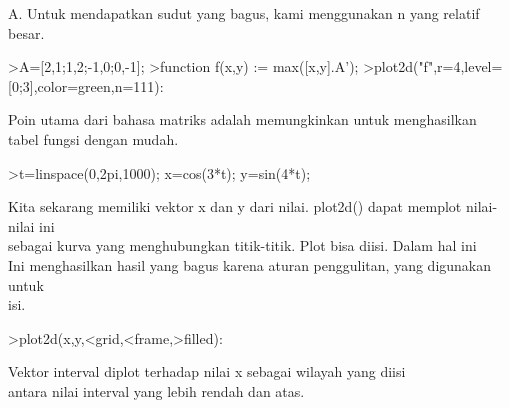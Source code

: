 \documentclass[a4paper,10pt]{article}
\begin{document}
\begin{eulernotebook}
\begin{eulercomment}
\begin{eulercomment}
\begin{eulercomment}
\begin{eulercomment}
\begin{eulercomment}
A. Untuk mendapatkan sudut yang bagus, kami menggunakan n yang relatif
besar.
\end{eulercomment}
\begin{eulerprompt}
>A=[2,1;1,2;-1,0;0,-1];
>function f(x,y) := max([x,y].A');
>plot2d("f",r=4,level=[0;3],color=green,n=111):
\end{eulerprompt}
\begin{eulercomment}
Poin utama dari bahasa matriks adalah memungkinkan untuk menghasilkan
tabel fungsi dengan mudah.
\end{eulercomment}
\begin{eulerprompt}
>t=linspace(0,2pi,1000); x=cos(3*t); y=sin(4*t);
\end{eulerprompt}
\begin{eulercomment}
Kita sekarang memiliki vektor x dan y dari nilai. plot2d() dapat
memplot nilai-nilai ini\\
sebagai kurva yang menghubungkan titik-titik. Plot bisa diisi. Dalam
hal ini\\
Ini menghasilkan hasil yang bagus karena aturan penggulitan, yang
digunakan untuk\\
isi.
\end{eulercomment}
\begin{eulerprompt}
>plot2d(x,y,<grid,<frame,>filled):
\end{eulerprompt}
\begin{eulercomment}
Vektor interval diplot terhadap nilai x sebagai wilayah yang diisi\\
antara nilai interval yang lebih rendah dan atas.


\end{eulercomment}
\end{eulercomment}
\end{eulercomment}
\end{eulercomment}
\end{eulercomment}
\end{eulernotebook}
\end{document}
